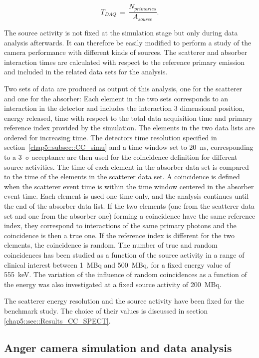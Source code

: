 \begin{equation}
T_{DAQ}\, = \,\frac{N_{primaries}}{A_{source}}.
\label{chap5::eq::DAQ_time}
\end{equation} 

The source activity is not fixed at the simulation stage but only during data analysis afterwards. It can therefore be easily modified to perform a study of the camera performance with different kinds of sources. The scatterer and absorber interaction times are calculated with respect to the reference primary emission and included in the related data sets for the analysis.

Two sets of data are produced as output of this analysis, one for the scatterer and one for the absorber: Each element in the two sets corresponds to an interaction in the detector and includes the interaction 3 dimensional position, energy released, time with respect to the total data acquisition time and primary reference index provided by the simulation. The elements in the two data lists are ordered for increasing time. The detectors time resolution specified in section~\ref{chap5::subsec::CC_simu} and a time window set to 20~ns, corresponding to a 3~$\mathrm{\sigma}$ acceptance are then used for the coincidence definition for different source activities. The time of each element in the absorber data set is compared to the time of the elements  in the scatterer data set. A coincidence is defined when the scatterer event time is within the time window centered in the absorber event time. Each element is used one time only, and the analysis continues until the end of the absorber data list. If the two  elements (one from the scatterer data set and one from the absorber one) forming a coincidence have the same reference index, they correspond to interactions of the same primary photons and the coincidence is then a true one. If the reference index is different for the two elements, the coincidence is random. The number of true and random coincidences has been studied as a function of the source activity in a range of clinical interest between 1~MBq and 500~MBq, for a fixed energy value of 555~keV. The variation of the influence of random coincidences as a function of the energy was also investigated at a fixed source activity of 200~MBq.

The scatterer energy resolution and the source activity have been fixed for the benchmark study. The choice of their values is discussed in section \ref{chap5::sec::Results_CC_SPECT}. 

\subsection{Anger camera simulation and data analysis}\label{chap5::subsec::Anger_descr}

